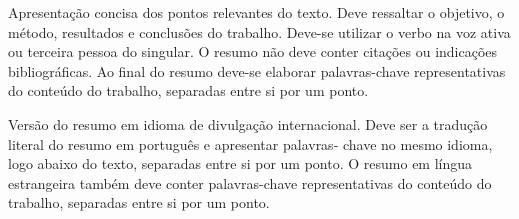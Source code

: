 
\resumo
{
Apresentação concisa dos pontos relevantes do texto. Deve ressaltar o objetivo, o método, resultados e conclusões do trabalho. Deve-se utilizar o verbo na voz ativa ou terceira pessoa do singular. O resumo não deve conter citações ou indicações bibliográficas.
} %
{
Ao final do resumo deve-se elaborar palavras-chave representativas do conteúdo do trabalho, separadas entre si por um ponto.
} %


\abstract
{
Versão do resumo em idioma de divulgação internacional. Deve ser a tradução literal do resumo em português e apresentar palavras- chave no mesmo idioma, logo abaixo do texto, separadas entre si por um ponto.
} %
{
O resumo em língua estrangeira também deve conter palavras-chave representativas do conteúdo do trabalho, separadas entre si por um ponto.
} %


\listafiguras
\listatabelas
{}


